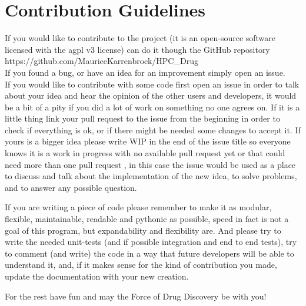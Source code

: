 

\section{Contribution Guidelines}
		
			If you would like to contribute to the project (it is an open-source software licensed with the agpl v3 license) can do it though the GitHub repository https://github.com/MauriceKarrenbrock/HPC\_Drug\\
			If you found a bug, or have an idea for an improvement simply open an issue.\\
			If you would like to contribute with some code first open an issue in order to talk about your idea and hear the opinion of the other users and developers, it would be a bit of a pity if you did a lot of work on something no one agrees on. If it is a little thing link your pull request to the issue from the beginning in order to check if everything is ok, or if there might be needed some changes to accept it. If yours is a bigger idea please write WIP in the end of the issue title so everyone knows it is a work in progress with no available pull request yet or that could need more than one pull request , in this case the issue would be used as a place to discuss and talk about the implementation of the new idea, to solve problems, and to answer any possible question.
			
			If you are writing a piece of code please remember to make it as modular, flexible, maintainable, readable and pythonic as possible, speed in fact is not a goal of this program, but expandability and flexibility are. And please try to write the needed unit-tests (and if possible integration and end to end tests), try to comment (and write) the code in a way that future developers will be able to understand it, and, if it makes sense for the kind of contribution you made, update the documentation with your new creation.
			
			For the rest have fun and may the Force of Drug Discovery be with you!